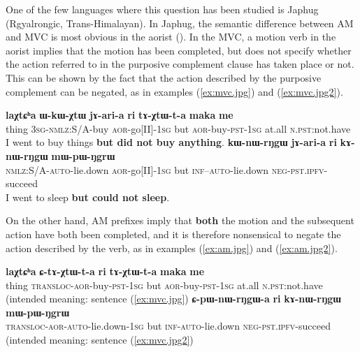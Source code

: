 \documentclass{article}
\newcommand{\ipa}[1]{\textbf{{\phon\mbox{#1}}}} %
\begin{document}
One of the few languages where this question has been studied is Japhug (Rgyalrongic, Trans-Himalayan). In Japhug, the semantic difference between AM and MVC is most obvious in the aorist (\citealt[203]{jacques13harmonization}). In the MVC, a motion verb in the aorist implies that the motion has been completed, but does not specify whether the action referred to in the purposive complement clause has taken place or not. This can be shown by the fact that the action described by the purposive complement can be negated, as in examples (\ref{ex:mvc.jpg}) and  (\ref{ex:mvc.jpg2}).

 \begin{exe}
\ex \label{ex:mvc.jpg}
\gll  \ipa{laχtɕʰa} \ipa{ɯ-kɯ-χtɯ} \ipa{jɤ-ari-a}  \ipa{ri} \ipa{tɤ-χtɯ-t-a} \ipa{maka} \ipa{me} \\
thing \textsc{3sg}-\textsc{nmlz}:S/A-buy \textsc{aor}-go[II]-\textsc{1sg} but \textsc{aor}-buy-\textsc{pst-1sg} at.all \textsc{n.pst}:not.have\\
\glt  I went to buy things \textbf{but did not buy anything}.
\ex \label{ex:mvc.jpg2}
\gll  \ipa{kɯ-nɯ-rŋgɯ}  	\ipa{jɤ-ari-a}  	\ipa{ri}  	\ipa{kɤ-nɯ-rŋgɯ}  	\ipa{mɯ-pɯ-ŋgrɯ}  	\\  
\textsc{nmlz}:S/A-\textsc{auto}-lie.down 	\textsc{aor}-go[II]-\textsc{1sg} but	\textsc{inf}--\textsc{auto}-lie.down 	\textsc{neg-pst.ipfv}-succeed \\
\glt  I went to sleep \textbf{but could not sleep}.
  \end{exe}
  
On the other hand, AM prefixes imply that \textbf{both} the motion and the subsequent action have both been completed, and it is therefore nonsensical to negate the action described by the verb, as in examples (\ref{ex:am.jpg}) and (\ref{ex:am.jpg2}).

 \begin{exe}
\ex \label{ex:am.jpg}
\gll  *\ipa{laχtɕʰa} \ipa{ɕ-tɤ-χtɯ-t-a}  \ipa{ri} \ipa{tɤ-χtɯ-t-a} \ipa{maka} \ipa{me} \\
thing \textsc{transloc}-\textsc{aor}-buy-\textsc{pst-1sg} but \textsc{aor}-buy-\textsc{pst-1sg}  at.all \textsc{n.pst}:not.have\\
\glt  (intended meaning: sentence (\ref{ex:mvc.jpg}) 
\ex \label{ex:am.jpg2}
\gll  *\ipa{ɕ-pɯ-nɯ-rŋgɯ-a}  	\ipa{ri}  	\ipa{kɤ-nɯ-rŋgɯ}  	\ipa{mɯ-pɯ-ŋgrɯ}  \\
\textsc{transloc-aor-auto}-lie.down-\textsc{1sg} but	\textsc{inf-auto}-lie.down 	\textsc{neg-pst.ipfv}-succeed \\
\glt  (intended meaning: sentence (\ref{ex:mvc.jpg2}) 
\end{exe}  
\end{document}
